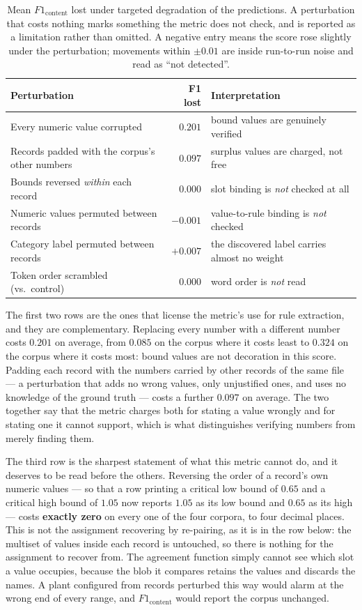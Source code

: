 \documentclass[11pt]{article}
\begin{document}
\begin{table}[H]
\centering
\caption{Mean $F1_{\text{content}}$ lost under targeted degradation of the
predictions. A perturbation that costs nothing marks something the metric does
not check, and is reported as a limitation rather than omitted. A negative
entry means the score rose slightly under the perturbation; movements within
$\pm 0.01$ are inside run-to-run noise and read as ``not detected''.}
\label{tab:perturbations}
\small
\begin{tabular}{lrl}
\toprule
\textbf{Perturbation} & \textbf{F1 lost} & \textbf{Interpretation} \\
\midrule
Every numeric value corrupted        & $\mathbf{0.201}$ & bound values are genuinely verified \\
Records padded with the corpus's other numbers & $\mathbf{0.097}$ & surplus values are charged, not free \\
Bounds reversed \emph{within} each record & $\mathbf{0.000}$ & slot binding is \emph{not} checked at all \\
Numeric values permuted between records & $-0.001$ & value-to-rule binding is \emph{not} checked \\
Category label permuted between records & $+0.007$ & the discovered label carries almost no weight \\
Token order scrambled (vs.\ control)    & $0.000$ & word order is \emph{not} read \\
\bottomrule
\end{tabular}
\end{table}

The first two rows are the ones that license the metric's use for rule
extraction, and they are complementary. Replacing every number with a different
number costs $0.201$ on average, from $0.085$ on the corpus where it costs least
to $0.324$ on the corpus where it costs most: bound values are not decoration in
this score. Padding each record with the numbers carried by other records of the
same file --- a perturbation that adds no wrong values, only unjustified ones,
and uses no knowledge of the ground truth --- costs a further $0.097$ on
average. The two together say that the metric charges both for stating a value
wrongly and for stating one it cannot support, which is what distinguishes
verifying numbers from merely finding them.

The third row is the sharpest statement of what this metric cannot do, and it
deserves to be read before the others. Reversing the order of a record's own
numeric values --- so that a row printing a critical low bound of $0.65$ and a
critical high bound of $1.05$ now reports $1.05$ as its low bound and $0.65$ as
its high --- costs \textbf{exactly zero} on every one of the four corpora, to
four decimal places. This is not the assignment recovering by re-pairing, as it
is in the row below: the multiset of values inside each record is untouched, so
there is nothing for the assignment to recover from. The agreement function
simply cannot see which slot a value occupies, because the blob it compares
retains the values and discards the names. A plant configured from records
perturbed this way would alarm at the wrong end of every range, and
$F1_{\text{content}}$ would report the corpus unchanged.
\end{document}
